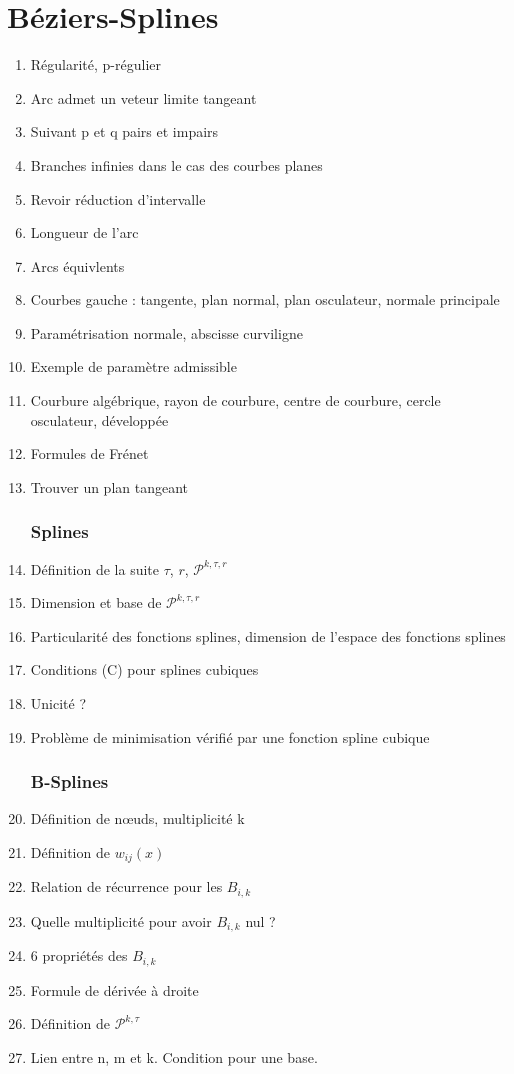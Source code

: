 \documentclass{article}
\begin{document}
\part{Béziers-Splines}
\begin{enumerate}
\section{Courbes paramétrées}
\item Régularité, p-régulier
\item Arc admet un veteur limite tangeant
\item Suivant p et q pairs et impairs
\item Branches infinies dans le cas des courbes planes
\item Revoir réduction d'intervalle
\item Longueur de l'arc
\item Arcs équivlents
\item Courbes gauche : tangente, plan normal, plan osculateur, normale principale
\item Paramétrisation normale, abscisse curviligne
\item Exemple de paramètre admissible
\item Courbure algébrique, rayon de courbure, centre de courbure, cercle osculateur, développée
\item Formules de Frénet
\item Trouver un plan tangeant
\section{Splines}
\item Définition de la suite $\tau$, $r$, $\mathcal{P}^{k,\tau,r}$
\item Dimension et base de $\mathcal{P}^{k,\tau,r}$
\item Particularité des fonctions splines, dimension de l'espace des fonctions splines
\item Conditions (C) pour splines cubiques
\item Unicité ?
\item Problème de minimisation vérifié par une fonction spline cubique
\section{B-Splines}
\item Définition de n\oe uds, multiplicité k
\item Définition de $w_{ij}(x)$
\item Relation de récurrence pour les $B_{i,k}$
\item Quelle multiplicité pour avoir $B_{i,k}$ nul ?
\item 6 propriétés des $B_{i,k}$
\item Formule de dérivée à droite
\item Définition de $\mathcal{P}^{k,\tau}$
\item Lien entre n, m et k. Condition pour une base.

\end{enumerate}
\end{document}
